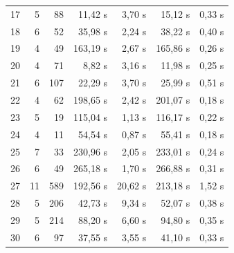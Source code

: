 \begin{table}[htbp]
{\begin{tabular}{r r r r r r r}
    17 & 5 & 88 & 11,42 s & 3,70 s & 15,12 s & 0,33 s \\
    18 & 6 & 52 & 35,98 s & 2,24 s & 38,22 s & 0,40 s \\
    19 & 4 & 49 & 163,19 s & 2,67 s & 165,86 s & 0,26 s \\
    20 & 4 & 71 & 8,82 s & 3,16 s & 11,98 s & 0,25 s \\
    21 & 6 & 107 & 22,29 s & 3,70 s & 25,99 s & 0,51 s \\
    22 & 4 & 62 & 198,65 s & 2,42 s & 201,07 s & 0,18 s \\
    23 & 5 & 19 & 115,04 s & 1,13 s & 116,17 s & 0,22 s \\
    24 & 4 & 11 & 54,54 s & 0,87 s & 55,41 s & 0,18 s \\
    25 & 7 & 33 & 230,96 s & 2,05 s & 233,01 s & 0,24 s \\
    26 & 6 & 49 & 265,18 s & 1,70 s & 266,88 s & 0,31 s \\
    27 & 11 & 589 & 192,56 s & 20,62 s & 213,18 s & 1,52 s \\
    28 & 5 & 206 & 42,73 s & 9,34 s & 52,07 s & 0,38 s \\
    29 & 5 & 214 & 88,20 s & 6,60 s & 94,80 s & 0,35 s \\
    30 & 6 & 97 & 37,55 s & 3,55 s & 41,10 s & 0,33 s \\
    \bottomrule
    \end{tabular}
    }
    \end{table}



